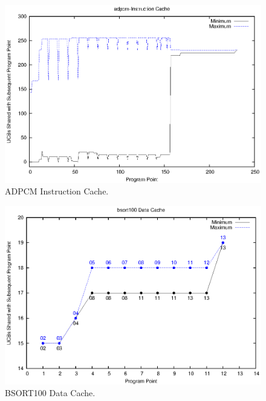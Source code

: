 %
\vspace{-20pt}
\begin{figure}[h!]
\begin{center}
\includegraphics[width=\linewidth]{eps/adpcm-icache.eps}
\caption{ADPCM Instruction Cache.}
\label{fig:adpcm_instruction_cache}
\end{center}
\end{figure}
%
\vspace{-20pt}
\begin{figure}[h!]
\begin{center}
\includegraphics[width=\linewidth]{eps/bsort100-dcache.eps}
\caption{BSORT100 Data Cache.}
\label{fig:bsort100_data_cache}
\end{center}
\end{figure}
%
\vspace{-20pt}
